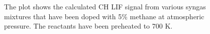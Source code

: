 \begin{figure}

\centering



\caption[Syngas-alkane-air flame results - II]{The plot shows the calculated CH LIF signal from various syngas mixtures that have been doped with 5\% methane at atmospheric pressure. The reactants have been preheated to 700 K.}

\label{fig:syngas-700}

\end{figure}
